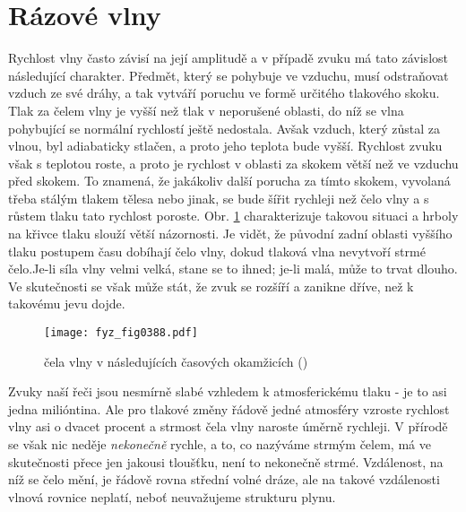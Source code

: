 \section{Rázové vlny}\label{fyz:IchapLIsecII}
  Rychlost vlny často závisí na její amplitudě a v případě zvuku má tato závislost následující 
  charakter. Předmět, který se pohybuje ve vzduchu, musí odstraňovat vzduch ze své dráhy, a tak 
  vytváří poruchu ve formě určitého tlakového skoku. Tlak za čelem vlny je vyšší než tlak v 
  neporušené oblasti, do níž se vlna pohybující se normální rychlostí ještě nedostala. Avšak 
  vzduch, který zůstal za vlnou, byl adiabaticky stlačen, a proto jeho teplota bude vyšší. Rychlost 
  zvuku však s teplotou roste, a proto je rychlost v oblasti za skokem větší než ve vzduchu před 
  skokem. To znamená, že jakákoliv další porucha za tímto skokem, vyvolaná třeba stálým tlakem 
  tělesa nebo jinak, se bude šířit rychleji než čelo vlny a s růstem tlaku tato rychlost poroste. 
  Obr. \ref{fyz:fig0388} charakterizuje takovou situaci a hrboly na křivce tlaku slouží větší 
  názornosti. Je vidět, že původní zadní oblasti vyššího tlaku postupem času dobíhají čelo vlny, 
  dokud tlaková vlna nevytvoří strmé čelo.Je-li síla vlny velmi velká, stane se to ihned; je-li 
  malá, může to trvat dlouho. Ve skutečnosti se však může stát, že zvuk se rozšíří a zanikne dříve, 
  než k takovému jevu dojde.
  \begin{figure}[ht!] %
    \centering
    \texttt{[image: fyz\_fig0388.pdf]}
    \caption{ čela vlny v následujících časových okamžicích
             (\cite[s.~688]{Feynman01})}
    \label{fyz:fig0388}
  \end{figure}
  
  Zvuky naší řeči jsou nesmírně slabé vzhledem k atmosferickému tlaku - je to asi jedna milióntina. 
  Ale pro tlakové změny řádově jedné atmosféry vzroste rychlost vlny asi o dvacet procent a strmost 
  čela vlny naroste úměrně rychleji. V přírodě se však nic neděje \emph{nekonečně} rychle, a to, co 
  nazýváme strmým čelem, má ve skutečnosti přece jen jakousi tloušťku, není to nekonečně strmé. 
  Vzdálenost, na níž se čelo mění, je řádově rovna střední volné dráze, ale na takové vzdálenosti 
  vlnová rovnice neplatí, neboť neuvažujeme strukturu plynu.
  
